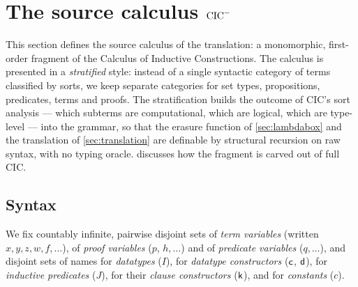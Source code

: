 \section{The source calculus \texorpdfstring{$\mathrm{CIC}^{-}$}{CIC-}}
\label{sec:calculus}

This section defines the source calculus of the translation: a monomorphic,
first-order fragment of the Calculus of Inductive Constructions.  The
calculus is presented in a \emph{stratified} style: instead of a single
syntactic category of terms classified by sorts, we keep separate
categories for set types, propositions, predicates, terms and proofs.  The
stratification builds the outcome of CIC's sort analysis --- which subterms
are computational, which are logical, which are type-level --- into the
grammar, so that the erasure function of \cref{sec:lambdabox} and the
translation of \cref{sec:translation} are definable by structural recursion
on raw syntax, with no typing oracle.   discusses how
the fragment is carved out of full CIC.

\subsection{Syntax}
\label{sec:calculus-syntax}

We fix countably infinite, pairwise disjoint sets of \emph{term
variables} (written $x, y, z, w, f, \dots$), of \emph{proof variables}
($p$, $h, \dots$) and of \emph{predicate variables} ($q, \dots$), and
disjoint sets of names for \emph{datatypes} ($I$), for \emph{datatype
constructors} ($\mathsf{c}$, $\mathsf{d}$), for \emph{inductive predicates}
($J$), for their \emph{clause constructors} ($\mathsf{k}$), and for
\emph{constants} ($c$).

